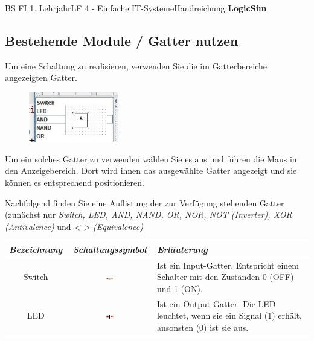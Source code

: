 \documentclass[11pt,oneside,openany,headings=optiontotoc,11pt,numbers=noenddot]{article}
\begin{document}
\begin{worksheet}{BS FI 1. Lehrjahr}{LF 4 - Einfache IT-Systeme}{Handreichung \textbf{LogicSim}}
		\subsection{Bestehende Module / Gatter nutzen}
		Um eine Schaltung zu realisieren, verwenden Sie die im Gatterbereiche angezeigten Gatter.
		\begin{figure}
			\vspace{-10pt}
			\hspace{-15pt}
			\includegraphics[width=0.35\textwidth]{../99_Bilder/gatter_LS.jpg}\\
		\end{figure}
		Um ein solches Gatter zu verwenden wählen Sie es aus 
		und führen die Maus in den Anzeigebereich. Dort wird ihnen das ausgewählte Gatter angezeigt und sie können es entsprechend positionieren.\\
		\par\noindent
		Nachfolgend finden Sie eine Auflistung der zur Verfügung stehenden Gatter (zunächst nur \textit{Switch, LED, AND, NAND, OR, NOR, NOT (Inverter), XOR (Antivalence)} und \textit{<-> (Equivalence)}\\
		\par\noindent
		\begin{tabularx}{\textwidth}{c|c|X}
			\textit{Bezeichnung} & \textit{Schaltungssymbol} & \textit{Erläuterung}\\
			\hline
			\hline
			Switch & \includegraphics[width=0.1\textwidth, align=t]{../99_Bilder/switch.jpg} & Ist ein Input-Gatter. Entspricht einem Schalter mit den Zuständen 0 (OFF) und 1 (ON).\\
			\hline
			LED & \includegraphics[width=0.1\textwidth,align=t]{../99_Bilder/LED.jpg} & Ist ein Output-Gatter. Die LED leuchtet, wenn sie ein Signal (1) erhält, ansonsten (0) ist sie aus.\\
			\hline
		\end{tabularx}
		\begin{tabularx}{\textwidth}{c|c|X|c}

\end{tabularx}
\end{worksheet}
\end{document}
